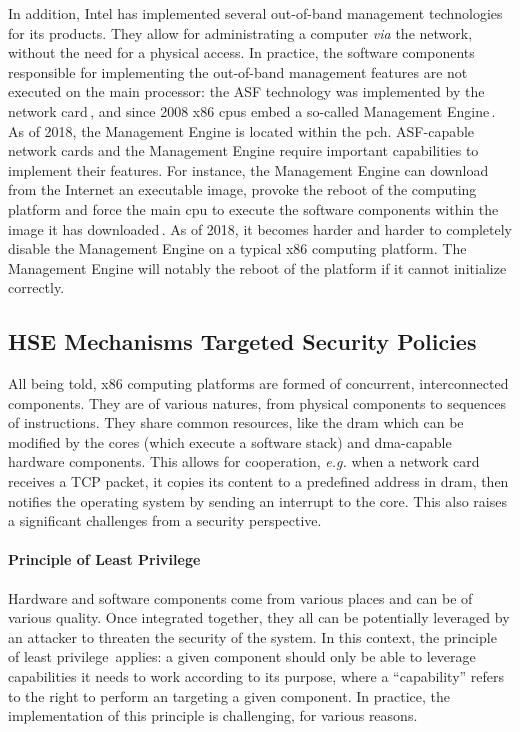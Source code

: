In addition, Intel has implemented several out-of-band management technologies
for its products.
%
They allow for administrating a computer \emph{via} the network, without the
need for a physical access.
%
In practice, the software components responsible for implementing the
out-of-band management features are not executed on the main processor: the ASF
technology was implemented by the network card\,\cite{duflot2010network}, and
since 2008 x86 \acp{cpu} embed a so-called Management
Engine\,\cite{ruan2014me,skochinsky2014intel}.
%
As of 2018, the Management Engine is located within the \ac{pch}.
%
ASF-capable network cards and the Management Engine require important
capabilities to implement their features.
%
For instance, the Management Engine can download from the Internet an executable
image, provoke the reboot of the computing platform and force the main \ac{cpu}
to execute the software components within the image it has
downloaded\,\cite{kumar2009active}.
%
As of 2018, it becomes harder and harder to completely disable the Management
Engine on a typical x86 computing platform.
%
The Management Engine will notably the reboot of the platform if it cannot
initialize correctly.

\subsection{HSE Mechanisms Targeted Security Policies}

All being told, x86 computing platforms are formed of concurrent, interconnected
components.
%
They are of various natures, from physical components to sequences of
instructions.
%
They share common resources, like the \ac{dram} which can be modified by the
cores (which execute a software stack) and \ac{dma}-capable hardware components.
%
This allows for cooperation, \emph{e.g.} when a network card receives a TCP
packet, it copies its content to a predefined address in \ac{dram}, then
notifies the operating system by sending an interrupt to the core.
%
This also raises a significant challenges from a security perspective.

\paragraph{Principle of Least Privilege}
%
Hardware and software components come from various places and can be of various
quality.
%
Once integrated together, they all can be potentially leveraged by an attacker
to threaten the security of the system.
%
In this context, the principle of least
privilege\,\cite{saltzer1975leastprivilege} applies: a given component should
only be able to leverage capabilities it needs to work according to its purpose,
where a ``capability'' refers to the right to perform an \IO targeting a given
component.
%
In practice, the implementation of this principle is challenging, for various
reasons.

